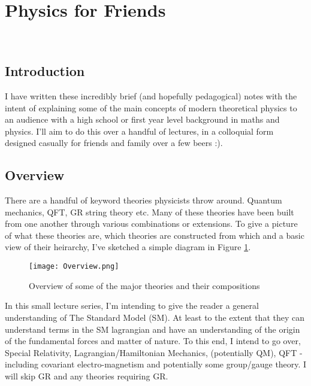 



\section*{Physics for Friends}

~

\subsection*{Introduction}

I have written these incredibly brief (and hopefully pedagogical) notes with the intent of explaining some of the main concepts of modern theoretical physics to an audience with a high school or first year level background in maths and physics. I'll aim to do this over a handful of lectures, in a colloquial form designed casually for friends and family over a few beers :).  

\subsection*{Overview}

There are a handful of keyword theories physicists throw around. Quantum mechanics, QFT, GR string theory etc. Many of these theories have been built from one another through various combinations or extensions. To give a picture of what these theories are, which theories are constructed from which and a basic view of their heirarchy, I've sketched a simple diagram in Figure \ref{fig:overview}. 

\begin{figure}[h]
  \centering
  \texttt{[image: Overview.png]}
\caption{Overview of some of the major theories and their compositions}
\label{fig:overview}
\end{figure}

In this small lecture series, I'm intending to give the reader a general understanding of The Standard Model (SM). At least to the extent that they can understand terms in the SM lagrangian and have an understanding of the origin of the fundamental forces and matter of nature. To this end, I intend to go over, Special Relativity, Lagrangian/Hamiltonian Mechanics, (potentially QM), QFT - including covariant electro-magnetism and potentially some group/gauge theory. I will skip GR and any theories requiring GR. \\

